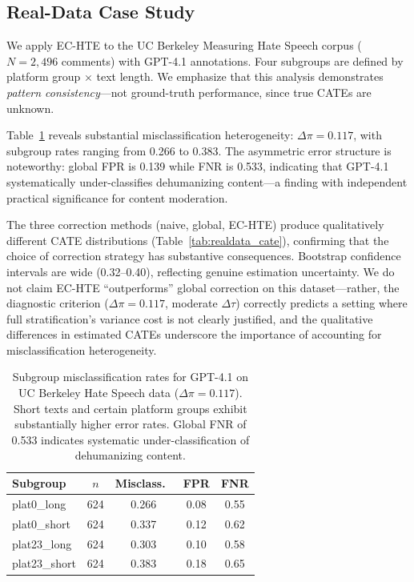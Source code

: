\documentclass[11pt]{article}
\newcommand{\dpi}{\Delta\pi}
\newcommand{\dtau}{\Delta\tau}
\begin{document}
\subsection{Real-Data Case Study}
\label{sec:realdata}

We apply EC-HTE to the UC Berkeley Measuring Hate Speech corpus \cite{kennedy2020constructing} ($N{=}2{,}496$ comments) with GPT-4.1 annotations.
Four subgroups are defined by platform group $\times$ text length.
We emphasize that this analysis demonstrates \textit{pattern consistency}---not ground-truth performance, since true CATEs are unknown.

Table~\ref{tab:realdata_misclass} reveals substantial misclassification heterogeneity: $\dpi = 0.117$, with subgroup rates ranging from 0.266 to 0.383.
The asymmetric error structure is noteworthy: global FPR is 0.139 while FNR is 0.533, indicating that GPT-4.1 systematically under-classifies dehumanizing content---a finding with independent practical significance for content moderation.

The three correction methods (naive, global, EC-HTE) produce qualitatively different CATE distributions (Table~\ref{tab:realdata_cate}), confirming that the choice of correction strategy has substantive consequences.
Bootstrap confidence intervals are wide (0.32--0.40), reflecting genuine estimation uncertainty.
We do not claim EC-HTE ``outperforms'' global correction on this dataset---rather, the diagnostic criterion ($\dpi = 0.117$, moderate $\dtau$) correctly predicts a setting where full stratification's variance cost is not clearly justified, and the qualitative differences in estimated CATEs underscore the importance of accounting for misclassification heterogeneity.

\begin{table}[t]
\centering
\small
\begin{tabular}{lcccc}
\toprule
Subgroup & $n$ & Misclass.\ & FPR & FNR \\
\midrule
plat0\_long & 624 & 0.266 & 0.08 & 0.55 \\
plat0\_short & 624 & 0.337 & 0.12 & 0.62 \\
plat23\_long & 624 & 0.303 & 0.10 & 0.58 \\
plat23\_short & 624 & 0.383 & 0.18 & 0.65 \\
\bottomrule
\end{tabular}
\caption{Subgroup misclassification rates for GPT-4.1 on UC Berkeley Hate Speech data ($\dpi = 0.117$). Short texts and certain platform groups exhibit substantially higher error rates. Global FNR of 0.533 indicates systematic under-classification of dehumanizing content.}
\label{tab:realdata_misclass}
\end{table}
\end{document}
